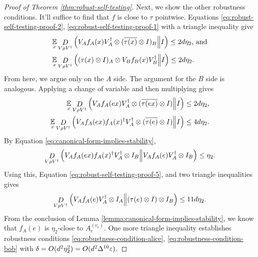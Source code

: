 \begin{proof}[Proof of Theorem \ref{thm:robust-self-testing}]
	Next, we show the other robustness conditions. It'll suffice to find that $f$ is close to $\tau$ pointwise. 
	Equations \eqref{eq:robust-self-testing-proof-2}, \eqref{eq:robust-self-testing-proof-1} with a triangle inequality give
	\begin{align}
		\operatorname*{\mathbb E}\limits_{x}&\mathop{D}\limits_{V\rho V^\dagger}\left(V_Af_A(x)V_A^\dagger\otimes (\overline{\tau(x)} \otimes I)_B\middle\| I\right)\leq 2d\eta_2\text{, and}
		\\
		\operatorname*{\mathbb E}\limits_{x}&\mathop{D}\limits_{V\rho V^\dagger}\left((\tau(x) \otimes I)_A\otimes V_Bf_B(x)V_B^\dagger\middle\| I\right) \leq 2d\eta_2.
	\end{align}
	From here, we argue only on the $A$ side. The argument for the $B$ side is analogous. Applying a change of variable and then multiplying gives
	\begin{align}
		\operatorname*{\mathbb E}\limits_{x}\mathop{D}\limits_{V\rho V^\dagger}\left(V_Af_A(ex)V_A^\dagger\otimes (\overline{\tau(ex)} \otimes I)\middle\| I\right) &\leq 2d\eta_2,
		\\
		\operatorname*{\mathbb E}\limits_{x}\mathop{D}\limits_{V\rho V^\dagger}\left(V_Af_A(ex)f_A(x)^\dagger V_A^\dagger\otimes (\overline{\tau(e)} \otimes I)\middle\| I\right) &\leq 4d\eta_2.
	\end{align}
	By Equation \eqref{eq:canonical-form-implies-stability},
	\begin{equation}
	\mathop{D}\limits_{V\rho V^\dagger}\left(V_Af_A(ex)f_A(x)^\dagger V_A^\dagger\otimes I_B\middle\| V_Af_A(e) V_A^\dagger\otimes I_B\right) \leq \eta_2.
	\end{equation}
	Using this, Equation \eqref{eq:robust-self-testing-proof-5}, and two triangle inequalities gives
	\begin{equation}
		\mathop{D}\limits_{V\rho V^\dagger}\left(V_Af_A(e)V_A^\dagger\otimes I_A\middle\| (\tau(e)\otimes I) \otimes I_B\right)
		\leq 11d\eta_2.
	\end{equation}
	From the conclusion of Lemma \ref{lemma:canonical-form-implies-stability}, we know that $f_A(e)$ is $\eta_2$-close to $A_e^{(v_e)}$. One more triangle inequality establishes robustness conditions \eqref{eq:robustness-condition-alice}, \eqref{eq:robustness-condition-bob} with $\delta = O(d^2\eta_2^2) = O(d^2\Delta^{10}\varepsilon)$.


\end{proof}